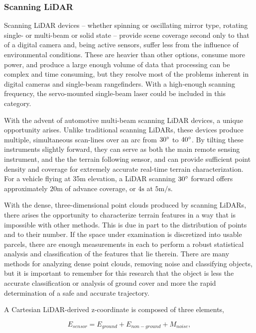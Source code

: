 \documentclass[10pt]{article}
\begin{document}
\subsubsection{Scanning LiDAR}

Scanning LiDAR devices -- whether spinning or oscillating mirror type, rotating single- or multi-beam or solid state -- provide scene coverage second only to that of a digital camera and, being active sensors, suffer less from the influence of environmental conditions. These are heavier than other options, consume more power, and produce a large enough volume of data that processing can be complex and time consuming, but they resolve most of the problems inherent in digital cameras and single-beam rangefinders. With a high-enough scanning frequency, the servo-mounted single-beam laser could be included in this category.

With the advent of automotive multi-beam scanning LiDAR devices, a unique opportunity arises. Unlike traditional scanning LiDARs, these devices produce multiple, simultaneous scan-lines over an arc from $30\degree$ to $40\degree$. By tilting these instruments slightly forward, they can serve as both the main remote sensing instrument, and the the terrain following sensor, and can provide sufficient point density and coverage for extremely accurate real-time terrain characterization. For a vehicle flying at 35m elevation, a LiDAR scanning $30\degree$ forward offers approximately $20\si{\m}$ of advance coverage, or $4\si{\s}$ at $5\si{\m\per\s}$. 

With the dense, three-dimensional point clouds produced by scanning LiDARs, there arises the opportunity to characterize terrain features in a way that is impossible with other methods. This is due in part to the distribution of points and to their number. If the space under examination is discretized into usable parcels, there are enough measurements in each to perform a robust statistical analysis and classification of the features that lie therein. There are many methods for analyzing dense point clouds, removing noise and classifying objects, but it is important to remember for this research that the object is less the accurate classification or analysis of ground cover and more the rapid determination of a safe and accurate trajectory.

A Cartesian LiDAR-derived z-coordinate is composed of three elements, 

\begin{equation}
E_{sensor} = E_{ground} + E_{non-ground} + M_{noise},
\label{eq:decel}
\end{equation} 
\end{document}
